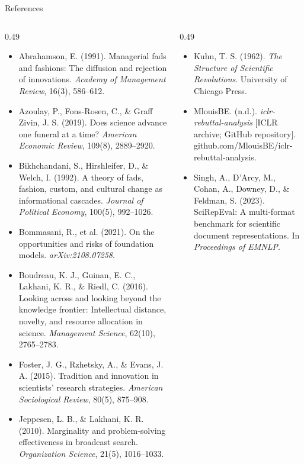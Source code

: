 \documentclass[aspectratio=169,11pt]{beamer}
\begin{document}
\begin{frame}{References}
  \fontsize{7}{8.2}\selectfont
  \begin{columns}[T]
    \begin{column}{0.49\textwidth}
      \begin{itemize}\setlength{\itemsep}{1pt}
        \item[] Abrahamson, E. (1991). Managerial fads and fashions: The diffusion and rejection of innovations. \emph{Academy of Management Review}, 16(3), 586--612.
        \item[] Azoulay, P., Fons-Rosen, C., \& Graff Zivin, J. S. (2019). Does science advance one funeral at a time? \emph{American Economic Review}, 109(8), 2889--2920.
        \item[] Bikhchandani, S., Hirshleifer, D., \& Welch, I. (1992). A theory of fads, fashion, custom, and cultural change as informational cascades. \emph{Journal of Political Economy}, 100(5), 992--1026.
        \item[] Bommasani, R., et al. (2021). On the opportunities and risks of foundation models. \emph{arXiv:2108.07258}.
        \item[] Boudreau, K. J., Guinan, E. C., Lakhani, K. R., \& Riedl, C. (2016). Looking across and looking beyond the knowledge frontier: Intellectual distance, novelty, and resource allocation in science. \emph{Management Science}, 62(10), 2765--2783.
        \item[] Foster, J. G., Rzhetsky, A., \& Evans, J. A. (2015). Tradition and innovation in scientists' research strategies. \emph{American Sociological Review}, 80(5), 875--908.
        \item[] Jeppesen, L. B., \& Lakhani, K. R. (2010). Marginality and problem-solving effectiveness in broadcast search. \emph{Organization Science}, 21(5), 1016--1033.
      \end{itemize}
    \end{column}
    \begin{column}{0.49\textwidth}
      \begin{itemize}\setlength{\itemsep}{1pt}
        \item[] Kuhn, T. S. (1962). \emph{The Structure of Scientific Revolutions}. University of Chicago Press.
        \item[] MlouisBE. (n.d.). \emph{iclr-rebuttal-analysis} [ICLR archive; GitHub repository]. github.com/MlouisBE/iclr-rebuttal-analysis.
        \item[] Singh, A., D'Arcy, M., Cohan, A., Downey, D., \& Feldman, S. (2023). SciRepEval: A multi-format benchmark for scientific document representations. In \emph{Proceedings of EMNLP}.

\end{itemize}
\end{column}
\end{columns}
\end{frame}
\end{document}
